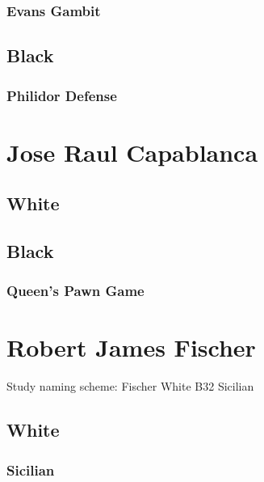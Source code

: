 \documentclass[]{book}
\begin{document}
\hypertarget{evans-gambit}{%
\subsection{Evans Gambit}\label{evans-gambit}}

\hypertarget{black}{%
\section{Black}\label{black}}

\hypertarget{philidor-defense}{%
\subsection{Philidor Defense}\label{philidor-defense}}

\hypertarget{capablanca}{%
\chapter{Jose Raul Capablanca}\label{capablanca}}

\hypertarget{white-1}{%
\section{White}\label{white-1}}

\hypertarget{black-1}{%
\section{Black}\label{black-1}}

\hypertarget{queens-pawn-game}{%
\subsection{Queen's Pawn Game}\label{queens-pawn-game}}

\hypertarget{fischer}{%
\chapter{Robert James Fischer}\label{fischer}}

Study naming scheme:
Fischer White B32 Sicilian

\hypertarget{white-2}{%
\section{White}\label{white-2}}

\hypertarget{sicilian}{%
\subsection{Sicilian}\label{sicilian}}
\end{document}
